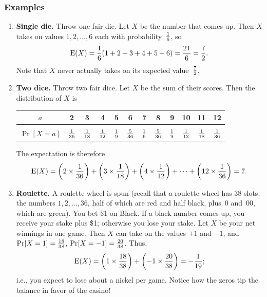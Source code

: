 \documentclass[11pt]{article}
\def\Ex#1{{\rm E}(#1)}
\begin{document}
\subsubsection*{Examples}
\begin{enumerate}

\item {\bf Single die.}  Throw one fair die.  Let $X$ be the
number that comes up.  Then $X$ takes on values $1,2,\ldots,6$
each with probability~$1\over 6$, so $$
   \Ex{X}={1\over 6}(1+2+3+4+5+6)={{21}\over 6} = {7\over 2}.  $$
Note that $X$ never actually takes on its expected value~$7\over 2$.

\item {\bf Two dice.}  Throw two fair dice.  Let $X$ be the sum
of their scores.  Then the distribution of $X$ is
\begin{center}\begin{tabular}{|c|ccccccccccc|}
\hline
$a$&2&3&4&5&6&7&8&9&10&11&12\\\hline\\[-12pt]
$\Pr[X=a]$&${1\over{36}}$&${1\over{18}}$&$1\over{12}$&$1\over 9$&$5\over{36}$&
           $1\over 6$&$5\over{36}$&$1\over 9$&$1\over{12}$&$1\over{18}$&$1\over{36}$\\[2pt]\hline
\end{tabular}\end{center}
The expectation is therefore $$
   \Ex{X}=\left(2\times{1\over{36}}\right)+\left(3\times{1\over{18}}\right)
          +\left(4\times{1\over{12}}\right)+\cdots+\left(12\times{1\over{36}}\right)=7.  $$

\item {\bf Roulette.}  A roulette wheel is spun (recall that a roulette wheel has 38
slots: the numbers $1,2,\ldots,36$, half of which are red and half black,
plus~0 and~00, which are green).  You bet \$1 on Black.
If a black number comes up, you receive your stake plus \$1; otherwise
you lose your stake.  Let $X$ be your net winnings in one game.  Then
$X$ can take on the values $+1$ and $-1$, and $\Pr[X=1]={{18}\over{38}}$,
$\Pr[X=-1]={{20}\over{38}}$.  Thus, $$
   \Ex{X} = \left(1\times{{18}\over{38}}\right) + \left(-1\times{{20}\over{38}}\right) = -{1\over{19}};  $$
i.e., you expect to lose about a nickel per game.
Notice how the zeros tip the balance in favor of the casino!
\end{enumerate}
\end{document}
